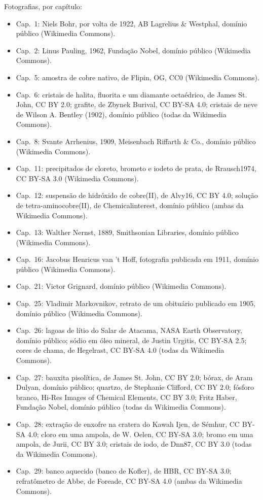 \bigskip
\noindent Fotografias, por capítulo:
\begin{itemize}\small
  \item Cap.~1: Niels Bohr, por volta de 1922, AB Lagrelius \& Westphal,
        domínio público (Wikimedia Commons).
  \item Cap.~2: Linus Pauling, 1962, Fundação Nobel, domínio público
        (Wikimedia Commons).
  \item Cap.~5: amostra de cobre nativo, de Flipin, OG, CC0 (Wikimedia
        Commons).
  \item Cap.~6: cristais de halita, fluorita e um diamante octaédrico, de
        James St. John, CC BY 2.0; grafite, de Zbynek Burival,
        CC BY-SA 4.0; cristais de neve de Wilson A. Bentley (1902), domínio
        público (todas da Wikimedia Commons).
  \item Cap.~8: Svante Arrhenius, 1909, Meisenbach Riffarth \& Co.,
        domínio público (Wikimedia Commons).
  \item Cap.~11: precipitados de cloreto, brometo e iodeto de prata, de
        Rrausch1974, CC BY-SA 3.0 (Wikimedia Commons).
  \item Cap.~12: suspensão de hidróxido de cobre(II), de Alvy16, CC BY 4.0;
        solução de tetra-aminocobre(II), de Chemicalinterest, domínio público (ambas
        da Wikimedia Commons).
  \item Cap.~13: Walther Nernst, 1889, Smithsonian Libraries, domínio
        público (Wikimedia Commons).
  \item Cap.~16: Jacobus Henricus van 't Hoff, fotografia publicada em
        1911, domínio público (Wikimedia Commons).
  \item Cap.~21: Victor Grignard, domínio público (Wikimedia Commons).
  \item Cap.~25: Vladimir Markovnikov, retrato de um obituário publicado
        em 1905, domínio público (Wikimedia Commons).
  \item Cap.~26: lagoas de lítio do Salar de Atacama, NASA Earth
        Observatory, domínio público; sódio em óleo mineral, de Justin
        Urgitis, CC BY-SA 2.5; cores de chama, de Hegelrast, CC BY-SA 4.0
        (todas da Wikimedia Commons).
  \item Cap.~27: bauxita pisolítica, de James St. John, CC BY 2.0; bórax,
        de Aram Dulyan, domínio público; quartzo, de Stephanie Clifford,
        CC BY 2.0; fósforo branco, Hi-Res Images of Chemical Elements,
        CC BY 3.0; Fritz Haber, Fundação Nobel, domínio público (todas da
        Wikimedia Commons).
  \item Cap.~28: extração de enxofre na cratera do Kawah Ijen, de
        S\'emhur, CC BY-SA 4.0; cloro em uma ampola, de W. Oelen,
        CC BY-SA 3.0; bromo em uma ampola, de Jurii, CC BY 3.0; cristais de
        iodo, de Dnn87, CC BY 3.0 (todas da Wikimedia Commons).
  \item Cap.~29: banco aquecido (banco de Kofler), de HBR, CC BY-SA 3.0;
        refratômetro de Abbe, de Foreade, CC BY-SA 4.0 (ambas da Wikimedia
        Commons).
\end{itemize}
\clearpage
